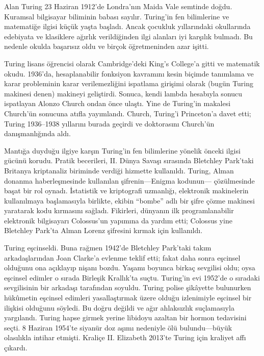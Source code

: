 



Alan Turing 23 Haziran 1912'de Londra'nın Maida Vale semtinde doğdu. Kuramsal
bilgisayar biliminin babası sayılır. Turing'in fen bilimlerine ve matematiğe
ilgisi küçük yaşta başladı. Ancak çocukluk yıllarındaki okullarında edebiyata
ve klasiklere ağırlık verildiğinden ilgi alanları iyi karşılık bulmadı. Bu
nedenle okulda başarısız oldu ve birçok öğretmeninden azar işitti.


Turing lisans öğrencisi olarak Cambridge'deki King's College'a gitti ve
matematik okudu. 1936'da, hesaplanabilir fonksiyon kavramını kesin biçimde
tanımlama ve karar probleminin karar verilemezliğini ispatlama girişimi olarak
(bugün Turing makinesi denen) makineyi geliştirdi. Sonuca, kendi lambda
hesabıyla sonucu ispatlayan Alonzo Church ondan önce ulaştı. Yine de Turing'in
makalesi Church'ün sonucuna atıfla yayımlandı. Church, Turing'i Princeton'a
davet etti; Turing 1936--1938 yıllarını burada geçirdi ve doktorasını Church'ün
danışmanlığında aldı.

Mantığa duyduğu ilgiye karşın Turing'in fen bilimlerine yönelik önceki ilgisi
gücünü korudu. Pratik becerileri, II. Dünya Savaşı sırasında Bletchley
Park'taki Britanya kriptanaliz biriminde verdiği hizmette kullanıldı. Turing,
Alman donanma haberleşmesinde kullanılan şifrenin---Enigma kodunun---
çözülmesinde başat bir rol oynadı. İstatistik ve kriptografi uzmanlığı,
elektronik makinelerin kullanılmaya başlamasıyla birlikte, ekibin ``bombe''
adlı bir şifre çözme makinesi yaratarak kodu kırmasını sağladı. Fikirleri,
dünyanın ilk programlanabilir elektronik bilgisayarı Colossus'un yapımına da
yardım etti; Colossus yine Bletchley Park'ta Alman Lorenz şifresini kırmak
için kullanıldı.

Turing eşcinseldi. Buna rağmen 1942'de Bletchley Park'taki takım
arkadaşlarından Joan Clarke'a evlenme teklif etti; fakat daha sonra eşcinsel
olduğunu ona açıklayıp nişanı bozdu. Yaşamı boyunca birkaç sevgilisi oldu;
oysa eşcinsel edimler o sırada Birleşik Krallık'ta suçtu. Turing'in evi
1952'de o sıradaki sevgilisinin bir arkadaşı tarafından soyuldu. Turing polise
şikâyette bulunurken hükûmetin eşcinsel edimleri yasallaştırmak üzere olduğu
izlenimiyle eşcinsel bir ilişkisi olduğunu söyledi. Bu doğru değildi ve ağır
ahlaksızlık suçlamasıyla yargılandı. Turing hapse girmek yerine libidoyu
azaltan bir hormon tedavisini seçti. 8 Haziran 1954'te siyanür doz aşımı
nedeniyle ölü bulundu---büyük olasılıkla intihar etmişti. Kraliçe II.
Elizabeth 2013'te Turing için kraliyet affı çıkardı.

